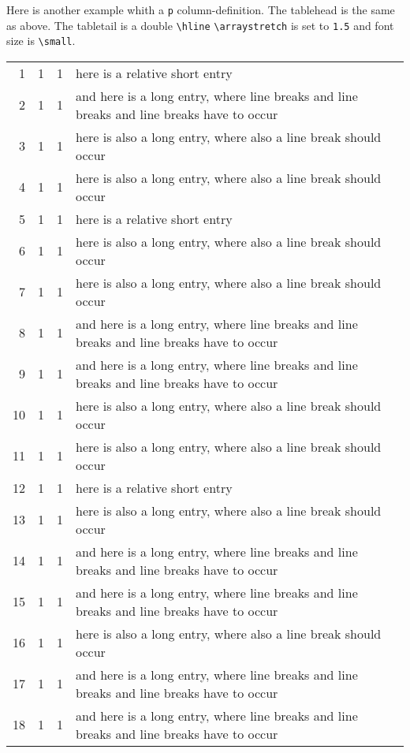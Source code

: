 Here is another example whith a {\tt p} column-definition. The tablehead
is the same as above. The tabletail is a double \verb|\hline|
\verb|\arraystretch| is set to {\tt 1.5} and font size is \verb|\small|.
\begin{center}
\tablelasttail{\hline\hline}
\renewcommand{\arraystretch}{1.5}
\small
\begin{supertabular}{| r@{\hspace{6.5mm}}| r@{\hspace{5.5mm}}| r p{5cm}|}
1  &  1  &  1  &  here is a relative short entry \\
2  &  1  &  1  &  and here is a long entry, where line breaks and line
                  breaks and line breaks have to occur \\
3  &  1  &  1  &  here is also a long entry, where also a line break
                  should occur\\
4  &  1  &  1  &  here is also a long entry, where also a line break
                  should occur\\
5  &  1  &  1  &  here is a relative short entry \\
6  &  1  &  1  &  here is also a long entry, where also a line break
                  should occur\\
7  &  1  &  1  &  here is also a long entry, where also a line break
                  should occur\\
8  &  1  &  1  &  and here is a long entry, where line breaks and line
                  breaks and line breaks have to occur \\
9  &  1  &  1  &  and here is a long entry, where line breaks and line
                  breaks and line breaks have to occur \\
10 &  1  &  1  &  here is also a long entry, where also a line break
                  should occur\\
11 &  1  &  1  &  here is also a long entry, where also a line break
                  should occur\\
12 &  1  &  1  &  here is a relative short entry \\
13 &  1  &  1  &  here is also a long entry, where also a line break
                  should occur\\
14 &  1  &  1  &  and here is a long entry, where line breaks and line
                  breaks and line breaks have to occur \\
15 &  1  &  1  &  and here is a long entry, where line breaks and line
                  breaks and line breaks have to occur \\
16 &  1  &  1  &  here is also a long entry, where also a line break
                  should occur\\
17 &  1  &  1  &  and here is a long entry, where line breaks and line
                  breaks and line breaks have to occur \\
18 &  1  &  1  &  and here is a long entry, where line breaks and line
                  breaks and line breaks have to occur \\
\end{supertabular}
\end{center}

